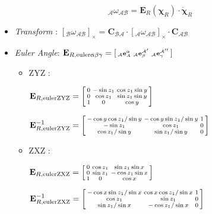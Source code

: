 \documentclass[landscape,a0paper,fontscale=0.285]{baposter} %
\newcommand{\compresslist}{ %
\setlength{\itemsep}{1pt}
\setlength{\parskip}{0pt}
\setlength{\parsep}{0pt}
}
\renewenvironment{bmatrix}{\left[\begin{smallmatrix}}{\end{smallmatrix}\right]}
\begin{document}
\begin{poster}
{\begin{itemize}
\end{itemize}

\colorbox[HTML]{CCFFFF}{}
\[
_{\mathcal{A}}\omega_{\mathcal{AB}} = \mathbf{E}_R(\boldsymbol{\chi}_R)\cdot \dot{\boldsymbol{\chi}}_R
\]
\vspace{-30pt}
\begin{itemize}\compresslist
    \item \textit{Transform} : $\left[_{\mathcal{B}}\omega_{\mathcal{AB}}\right]_{\times} = \mathbf{C}_{\mathcal{BA}}\cdot \left[_{\mathcal{A}}\omega_{\mathcal{AB}}\right]_{\times}\cdot \mathbf{C}_{\mathcal{AB}}$
    \item \textit{Euler Angle}: $\mathbf{E}_{R,\text{euler} \alpha\beta\gamma} = \begin{bmatrix}_{\mathcal{A}}\mathbf{e}_A^{\mathcal{\alpha}} & _{\mathcal{A}}\mathbf{e}_\beta^{\mathcal{A}'} & _{\mathcal{A}}\mathbf{e}_\gamma^{\mathcal{A}''}\end{bmatrix}$
      \begin{itemize}[label=$\circ$]\compresslist
        \item ZYZ : 
        
        $\mathbf{E}_{R,\text{eulerZYZ}} = \begin{bmatrix}0 & -\sin z_1 & \cos z_1\sin y \\ 0 & \cos z_1 & \sin z_1\sin y \\ 1 & 0 & \cos y\end{bmatrix}$ 
        
        \hspace{-10pt}$\mathbf{E}^{-1}_{R,\text{eulerZYZ}} = \begin{bmatrix}-\cos y\cos z_1/\sin y & -\cos y \sin z_1/\sin y & 1 \\ -\sin z_1 & \cos z_1 & 0 \\ \cos z_1/\sin y & \sin z_1/ \sin y & 0\end{bmatrix}$
        \item ZXZ : 
        
        $\mathbf{E}_{R,\text{eulerZXZ}}=\begin{bmatrix}0 & \cos z_1 & \sin z_1 \sin x \\ 0 & \sin z_1 & -\cos z_1 \sin x \\ 1 & 0 & \cos x\end{bmatrix}$ 
        
        \hspace{-5pt}$\mathbf{E}^{-1}_{R,\text{eulerZXZ}} = \begin{bmatrix}-\cos x\sin z_1/\sin x & \cos x\cos z_1/\sin x & 1 \\ \cos z_1 & \sin z_1 & 0 \\ \sin z_1 /\sin x & -\cos z_1/ \sin x & 0\end{bmatrix}$
       \end{itemize}
       

\end{itemize}}
\end{poster}
\end{document}
